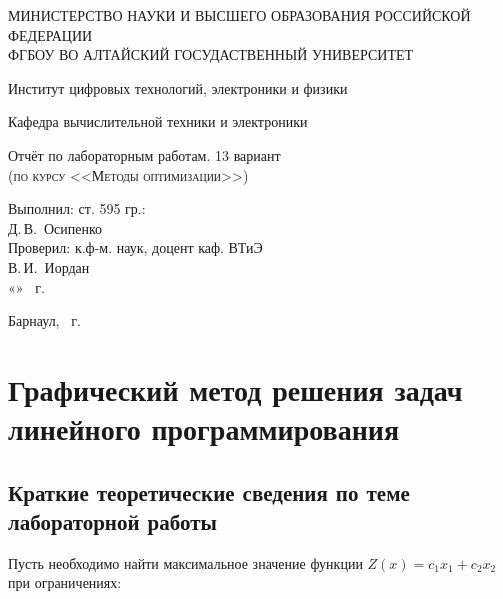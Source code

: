 \documentclass[a4paper, 12pt]{article}
\begin{document}
\begin{titlepage}
  \begin{center}
    \MakeUppercase{Министерство науки и высшего образования Российской Федерации} \\
    \MakeUppercase{ФГБОУ ВО Алтайский госудаственный университет}
    \vspace{0.25cm}
    
	  Институт цифровых технологий, электроники и физики
    
    Кафедра вычислительной техники и электроники
    \vfill
    
    {\LARGE Отчёт по лабораторным работам. 13 вариант}\\[5mm]
    \textsc{(по курсу <<Методы оптимизации>>)}
  \bigskip

\end{center}
\vfill

\newlength{\ML}
\hfill
\begin{minipage}{0.45\textwidth}
  Выполнил: ст. 595 гр.:\\
  \underline{\hspace{\ML}} Д.\,В.~Осипенко\\
  Проверил: к.ф-м. наук, доцент каф. ВТиЭ\\
  \underline{\hspace{\ML}} В.\,И.~Иордан\\
  «\underline{\hspace{0.7cm}}» \underline{\hspace{2cm}} \the\year~г.
\end{minipage}%
\vfill

\begin{center}
  Барнаул, \the\year~г.
\end{center}
\end{titlepage}
\tableofcontents
\newpage

\section{Графический метод решения задач линейного программирования}
\subsection{Краткие теоретические сведения по теме лабораторной работы}
Пусть необходимо найти максимальное значение функции $Z(x) =c_1x_1 + c_2x_2 $ при ограничениях:\\
\end{document}
